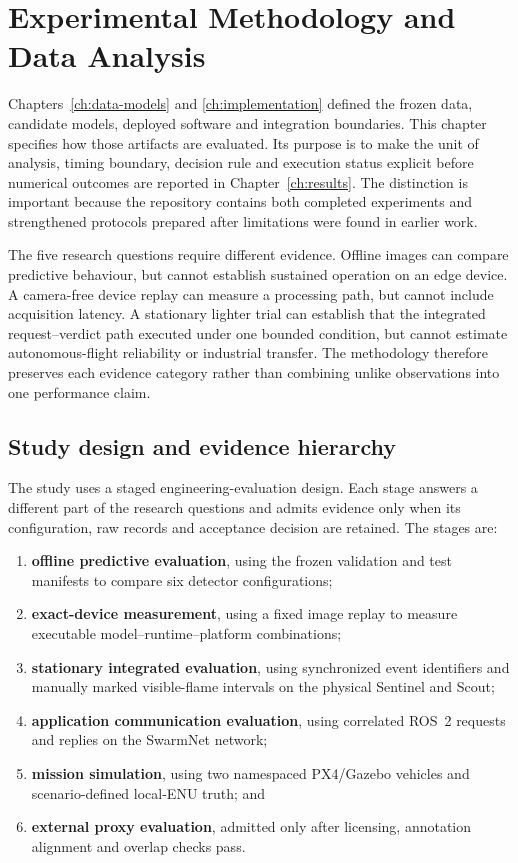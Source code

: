 \chapter{Experimental Methodology and Data Analysis}
\label{ch:methodology}

Chapters~\ref{ch:data-models} and \ref{ch:implementation} defined the frozen
data, candidate models, deployed software and integration boundaries. This
chapter specifies how those artifacts are evaluated. Its purpose is to make
the unit of analysis, timing boundary, decision rule and execution status
explicit before numerical outcomes are reported in Chapter~\ref{ch:results}.
The distinction is important because the repository contains both completed
experiments and strengthened protocols prepared after limitations were found
in earlier work.

The five research questions require different evidence. Offline images can
compare predictive behaviour, but cannot establish sustained operation on an
edge device. A camera-free device replay can measure a processing path, but
cannot include acquisition latency. A stationary lighter trial can establish
that the integrated request--verdict path executed under one bounded
condition, but cannot estimate autonomous-flight reliability or industrial
transfer. The methodology therefore preserves each evidence category rather
than combining unlike observations into one performance claim.

\section{Study design and evidence hierarchy}
\label{sec:methodology:1}

The study uses a staged engineering-evaluation design. Each stage answers a
different part of the research questions and admits evidence only when its
configuration, raw records and acceptance decision are retained. The stages
are:

\begin{enumerate}
  \item \textbf{offline predictive evaluation}, using the frozen validation
  and test manifests to compare six detector configurations;
  \item \textbf{exact-device measurement}, using a fixed image replay to
  measure executable model--runtime--platform combinations;
  \item \textbf{stationary integrated evaluation}, using synchronized event
  identifiers and manually marked visible-flame intervals on the physical
  Sentinel and Scout;
  \item \textbf{application communication evaluation}, using correlated ROS~2
  requests and replies on the SwarmNet network;
  \item \textbf{mission simulation}, using two namespaced PX4/Gazebo vehicles
  and scenario-defined local-ENU truth; and
  \item \textbf{external proxy evaluation}, admitted only after licensing,
  annotation alignment and overlap checks pass.
\end{enumerate}

